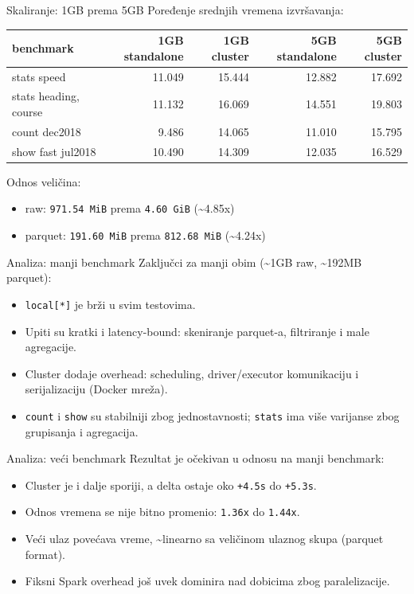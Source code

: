 \documentclass[aspectratio=169,11pt]{beamer}
\newcommand{\code}[1]{\texttt{\small #1}}
\begin{document}
\begin{frame}{Skaliranje: 1GB prema 5GB}
  Poređenje srednjih vremena izvršavanja:

  \vspace{0.15cm}
  \scriptsize
  \begin{tabular}{lrrrr}
    \toprule
    benchmark & 1GB standalone & 1GB cluster & 5GB standalone & 5GB cluster \\
    \midrule
    stats speed & 11.049 & 15.444 & 12.882 & 17.692 \\
    stats heading, course & 11.132 & 16.069 & 14.551 & 19.803 \\
    count dec2018 & 9.486 & 14.065 & 11.010 & 15.795 \\
    show fast jul2018 & 10.490 & 14.309 & 12.035 & 16.529 \\
    \bottomrule
  \end{tabular}
  \normalsize

  \vspace{0.3cm}
  Odnos veličina:
  \begin{itemize}
    \item raw: \code{971.54 MiB} prema \code{4.60 GiB} (\textasciitilde 4.85x)
    \item parquet: \code{191.60 MiB} prema \code{812.68 MiB} (\textasciitilde 4.24x)
  \end{itemize}
\end{frame}

\begin{frame}{Analiza: manji benchmark}
  Zaključci za manji obim (\textasciitilde 1GB raw, \textasciitilde 192MB parquet):
  \begin{itemize}
    \item \code{local[*]} je brži u svim testovima.
    \item Upiti su kratki i latency-bound: skeniranje parquet-a, filtriranje i male agregacije.
    \item Cluster dodaje overhead: scheduling, driver/executor komunikaciju i serijalizaciju (Docker mreža).
    \item \code{count} i \code{show} su stabilniji zbog jednostavnosti; \code{stats} ima više varijanse zbog grupisanja i agregacija.
  \end{itemize}
\end{frame}

\begin{frame}{Analiza: veći benchmark}
  Rezultat je očekivan u odnosu na manji benchmark:
  \begin{itemize}
    \item Cluster je i dalje sporiji, a delta ostaje oko \code{+4.5s} do \code{+5.3s}.
    \item Odnos vremena se nije bitno promenio: \code{1.36x} do \code{1.44x}.
    \item Veći ulaz povećava vreme, \textasciitilde linearno sa veličinom ulaznog skupa (parquet format).
    \item Fiksni Spark overhead još uvek dominira nad dobicima zbog paralelizacije.
  \end{itemize}
\end{frame}
\end{document}
